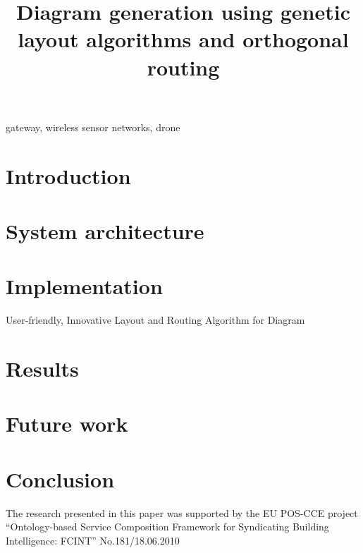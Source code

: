 \documentclass[conference]{IEEEtran}
\begin{document}
\title{Diagram generation using genetic layout algorithms and orthogonal routing}



\author{
  }

\maketitle

\begin{abstract} 

\cite{doroftei2007omnidirectional}
\end{abstract}

\begin{IEEEkeywords}
gateway, wireless sensor networks, drone
\end{IEEEkeywords}

\section{Introduction}
\label{sec:introduction}


\section{System architecture}
\label{sec:architecture}


\section{Implementation}
\label{sec:implementation} User-friendly, Innovative Layout and Routing Algorithm for Diagram



\section{Results} 
\label{sec:results}


\section{Future work} 
\label{sec:future}


\section{Conclusion}
\label{sec:conclusion}


The research presented in this paper was supported by the EU POS-CCE project
“Ontology-based Service Composition Framework for Syndicating Building
Intelligence: FCINT” No.181/18.06.2010




\end{document}
